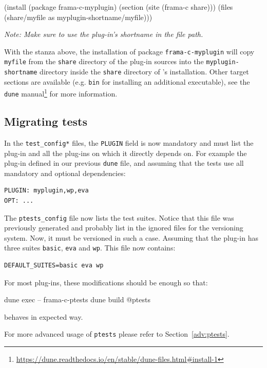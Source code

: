 \begin{dunecode}
(install
  (package frama-c-myplugin)
  (section (site (frama-c share)))
  (files (share/myfile as myplugin-shortname/myfile)))
\end{dunecode}

{\em Note: Make sure to use the plug-in's shortname in the file path.}

With the stanza above, the installation of package \texttt{frama-c-myplugin}
will copy \texttt{myfile} from the \texttt{share} directory
of the plug-in sources into the \texttt{myplugin-shortname} directory inside
the \texttt{share} directory of \framac's installation. Other target sections
are available (e.g. \texttt{bin} for installing an additional executable), see
the \texttt{dune}
manual\footnote{\url{https://dune.readthedocs.io/en/stable/dune-files.html\#install-1}}
for more information.

\subsection{Migrating tests}

In the \texttt{test\_config*} files, the \texttt{PLUGIN} field is now mandatory
and must list the plug-in and all the plug-ins on which it directly depends on.
For example the plug-in defined in our previous \texttt{dune} file, and assuming
that the tests use all mandatory and optional dependencies:

\begin{lstlisting}
PLUGIN: myplugin,wp,eva
OPT: ...
\end{lstlisting}

The \texttt{ptests\_config} file now lists the test suites. Notice that this file
was previously generated and probably list in the ignored files for the versioning
system. Now, it must be versioned in such a case. Assuming that the plug-in has
three suites \texttt{basic}, \texttt{eva} and \texttt{wp}. This file now
contains:

\begin{lstlisting}
DEFAULT_SUITES=basic eva wp
\end{lstlisting}

For most plug-ins, these modifications should be enough so that:
\begin{logs}
dune exec -- frama-c-ptests
dune build @ptests
\end{logs}
behaves in expected way.

For more advanced usage of \texttt{ptests} please refer to Section~\ref{adv:ptests}.


